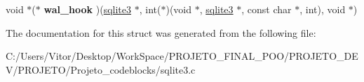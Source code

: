 \begin{DoxyCompactItemize}
\item 
\hypertarget{structsqlite3__api__routines_ad2420d28d695f23941f69e53777819a9}{void $\ast$($\ast$ {\bfseries wal\-\_\-hook} )(\hyperlink{structsqlite3}{sqlite3} $\ast$, int($\ast$)(void $\ast$, \hyperlink{structsqlite3}{sqlite3} $\ast$, const char $\ast$, int), void $\ast$)}\label{structsqlite3__api__routines_ad2420d28d695f23941f69e53777819a9}

\end{DoxyCompactItemize}


The documentation for this struct was generated from the following file\-:\begin{DoxyCompactItemize}
\item 
C\-:/\-Users/\-Vitor/\-Desktop/\-Work\-Space/\-P\-R\-O\-J\-E\-T\-O\-\_\-\-F\-I\-N\-A\-L\-\_\-\-P\-O\-O/\-P\-R\-O\-J\-E\-T\-O\-\_\-\-D\-E\-V/\-P\-R\-O\-J\-E\-T\-O/\-Projeto\-\_\-codeblocks/sqlite3.\-c\end{DoxyCompactItemize}
